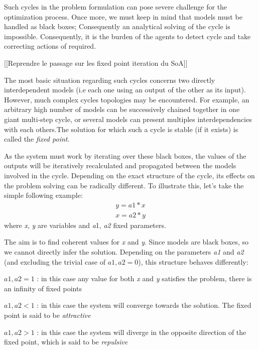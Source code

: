 Such cycles in the problem formulation can pose severe challenge for the optimization process. Once more, we must keep in mind that models must be handled as black boxes; Consequently an analytical solving of the cycle is impossible. Consequently, it is the burden of the agents to detect cycle and take correcting actions of required.

[[Reprendre le passage sur les fixed point iteration du SoA]]

The most basic situation regarding such cycles concerns two directly interdependent models (i.e each one using an output of the other as its input). However, much complex cycles topologies may be encountered. For example, an arbitrary high number of models can be successively chained together in one giant multi-step cycle, or several models can present multiples interdependencies with each others.The solution for which such a cycle is stable (if it exists) is called the \emph{fixed point}.

As the system must work by iterating over these black boxes, the values of the outputs will be iteratively recalculated and propagated between the models involved in the cycle. Depending on the exact structure of the cycle, its effects on the problem solving can be radically different. To illustrate this, let's take the simple following example:
\begin{gather*}
y = a1 * x \\
x = a2 * y
\end{gather*}
where \emph{x}, \emph{y} are variables and \emph{a}1, \emph{a2} fixed parameters.
 
The aim is to find coherent values for \emph{x} and \emph{y}. Since models are black boxes, so we cannot directly infer the solution. Depending on the parameters \emph{a1} and \emph{a2} (and excluding the trivial case of \(a1, a2  = 0\)), this structure behaves differently: 
 
\begin{compactitem}
\item \(a1, a2 = 1\) : in this case any value for both \emph{x} and \emph{y} satisfies the problem, there is an infinity of fixed points
\item \(a1, a2 < 1\) : in this case the system will converge towards the solution. The fixed point is said to be \emph{attractive}
\item \(a1, a2 > 1\) : in this case the system will diverge in the opposite direction of the fixed point, which is said to be \emph{repulsive}
\end{compactitem}

